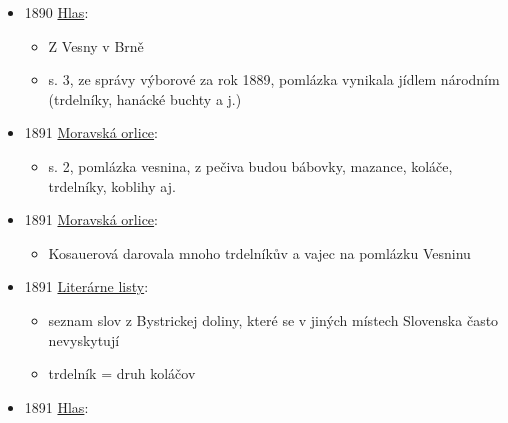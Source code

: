 \begin{itemize}
  \begin{itemize}
  \tightlist
  \item
  \item
    s. 158  na vaječník, je to plát nekynutýho těsta z
    mouky, másla, cukru, žloutků, smetany, sněhu z bílku. omotá se na
    trubičku, ováže špagátem a smaží v másle. plní se krémem.
  \end{itemize}
\item
  1890
  \href{https://www.digitalniknihovna.cz/vkol/uuid/uuid:f45a5253-4519-4c95-b6b4-726870590442}{Hlas}:

  \begin{itemize}
  \tightlist
  \item
    Z Vesny v Brně
  \item
    s. 3, ze správy výborové za rok 1889, pomlázka vynikala jídlem
    národním (trdelníky, hanácké buchty a j.)
  \end{itemize}
\item
  1891
  \href{https://ceskadigitalniknihovna.cz/uuid/uuid:04e43cad-32f0-11de-992b-00145e5790ea}{Moravská
  orlice}:

  \begin{itemize}
  \tightlist
  \item
    s. 2, pomlázka vesnina, z pečiva budou bábovky, mazance, koláče,
    trdelníky, koblihy aj.
  \end{itemize}
\item
  1891
  \href{https://ceskadigitalniknihovna.cz/uuid/uuid:27df031c-32f0-11de-992b-00145e5790ea}{Moravská
  orlice}:

  \begin{itemize}
  \tightlist
  \item
    Kosauerová darovala mnoho trdelníkův a vajec na pomlázku Vesninu
  \end{itemize}
\item
  1891
  \href{https://www.google.cz/books/edition/Liter\%C3\%A1rne_listy/iTmko65VuoQC?hl=cs&gbpv=1&dq=trdeln\%C3\%ADk&pg=RA5-PA64&printsec=frontcover}{Literárne
  listy}:

  \begin{itemize}
  \tightlist
  \item
    seznam slov z Bystrickej doliny, které se v jiných místech Slovenska
    často nevyskytují
  \item
    trdelník = druh koláčov
  \end{itemize}
\item
  1891
  \href{https://www.digitalniknihovna.cz/vkol/uuid/uuid:5af1abbe-3242-4f6e-8b01-b8ea16715e7c}{Hlas}:


\end{itemize}
